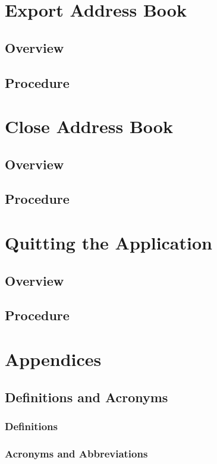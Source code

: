 \documentclass[a4paper, 11pt]{article}
\begin{document}
\section{Export Address Book}
\subsection{Overview}
\subsection{Procedure}


\section{Close Address Book}
\subsection{Overview}
\subsection{Procedure}


\section{Quitting the Application}
\subsection{Overview}
\subsection{Procedure}


\section{Appendices}

\subsection{Definitions and Acronyms}
\subsubsection{Definitions}
\subsubsection{Acronyms and Abbreviations}
\end{document}
